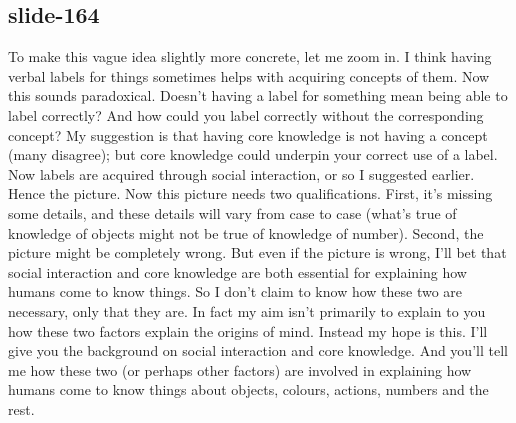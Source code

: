 \documentclass[12pt,\papersize]{extarticle}
\begin{document}
 
\subsection{slide-164}
To make this vague idea slightly more concrete, let me zoom in.
I think having verbal labels for things sometimes helps with acquiring concepts of them.
Now this sounds paradoxical. Doesn't having a label for something mean being able to label correctly? And how could you label correctly without the corresponding concept?
My suggestion is that having core knowledge is not having a concept (many disagree);
but core knowledge could underpin your correct use of a label.
Now labels are acquired through social interaction, or so I suggested earlier.
Hence the picture.
Now this picture needs two qualifications. First, it's missing some details, and these details will vary from case to case (what's true of knowledge of objects might not be true of knowledge of number). Second, the picture might be completely wrong.
But even if the picture is wrong, I'll bet that social interaction and core knowledge are both essential for explaining how humans come to know things.
So I don't claim to know how these two are necessary, only that they are.
In fact my aim isn't primarily to explain to you how these two factors explain the origins of mind.
Instead my hope is this.
I'll give you the background on social interaction and core knowledge.
And you'll tell me how these two (or perhaps other factors) are involved in explaining how humans come to know things about objects, colours, actions, numbers and the rest.
 

 






\end{document}
